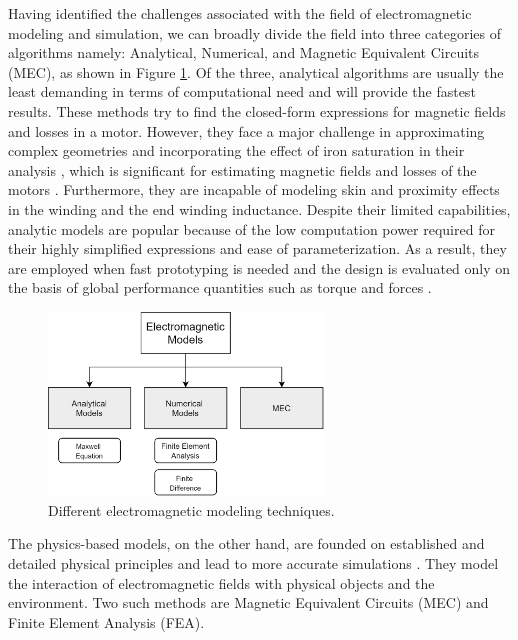Having identified the challenges associated with the field of electromagnetic modeling and simulation, we can broadly divide the field into three categories of algorithms namely: Analytical, Numerical, and Magnetic Equivalent Circuits (MEC), as shown in Figure \ref{fig:CNN_model_techniques}. Of the three, analytical algorithms are usually the least demanding in terms of computational need and will provide the fastest results. These methods try to find the closed-form expressions for magnetic fields and losses in a motor. However, they face a major challenge in approximating complex geometries and incorporating the effect of iron saturation in their analysis \parencite{alger1970induction,hamdi1994design}, which is significant for estimating magnetic fields and losses of the motors \parencite{sheikh2009improved}. Furthermore, they are incapable of modeling skin and proximity effects in the winding and the end winding inductance. Despite their limited capabilities, analytic models are popular because of the low computation power required for their highly simplified expressions and ease of parameterization. As a result, they are employed when fast prototyping is needed and the design is evaluated only on the basis of global performance quantities such as torque and forces \parencite{ray1984switched, krishnan1988design}.

\begin{figure}
    \centering
    \includegraphics[width=0.65\textwidth]{Figures/Chp2_CNN/EM_model_techniques.png}
    \caption{Different electromagnetic modeling techniques.}
    \label{fig:CNN_model_techniques}
\end{figure}

The physics-based models, on the other hand, are founded on established and detailed physical principles and lead to more accurate simulations \parencite{salon1995finite}. They model the interaction of electromagnetic fields with physical objects and the environment. Two such methods are Magnetic Equivalent Circuits (MEC) and Finite Element Analysis (FEA). 

